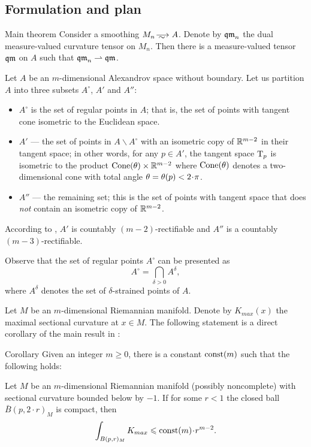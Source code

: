 \subsection{Formulation and plan}
  
\begin{thm}{Main theorem}\label{main}
Consider a smoothing $M_n\smooths{} A$.
Denote by $\operatorname{\mathfrak{qm}}_n$ the dual measure-valued curvature tensor on $M_n$.
Then there is a measure-valued tensor $\operatorname{\mathfrak{qm}}$ on $A$ such that $\operatorname{\mathfrak{qm}}_n\rightharpoonup \operatorname{\mathfrak{qm}}$.
\end{thm}

Let $A$ be an $m$-dimensional Alexandrov space without boundary. 
Let us partition $A$ into three subsets $A^\circ$, $A'$ and $A''$:
\begin{itemize}
\item $A^\circ$ is the set of regular points in $A$; that is, the set of points with tangent cone isometric to the Euclidean space.
\item $A'$ --- the set of points in $A\backslash A^\circ$ with an isometric copy of $\mathbb{R}^{m-2}$ in their tangent space;
in other words, for any $p\in A'$, the tangent space $\mathrm{T}_p$ is isometric to the product $\operatorname{Cone}(\theta)\times\mathbb{R}^{m-2}$ where $\operatorname{Cone}(\theta)$ denotes a two-dimensional cone with total angle $\theta\zz=\theta(p)<2\cdot \pi$.
\item $A''$ --- the remaining set; this is the set of points with tangent space that does \emph{not} contain an isometric copy of $\mathbb{R}^{m-2}$.
\end{itemize}
According to \cite{li-naber}, $A'$ is countably $(m-2)$-rectifiable and $A''$ is a countably $(m-3)$-rectifiable. 

Observe that the set of regular points $A^\circ$ can be presented as
$$A^{\circ}=\bigcap_{\delta>0} A^\delta,$$
where $A^\delta$ denotes the set of $\delta$-strained points of $A$.

Let $M$ be an $m$-dimensional Riemannian manifold.
Denote by $K_{max}(x)$ the maximal sectional curvature at $x\in M$.
The following statement is a direct corollary of the main result in \cite{petrunin-SC}:

\begin{thm}{Corollary}\label{cor:Kmax}
Given an integer $m\ge 0$, there is a constant $\mathrm{const}(m)$ such that the following holds:

Let $M$ be an $m$-dimensional Riemannian manifold 
(possibly noncomplete)
with sectional curvature bounded below by $-1$.
If for some $r<1$ the closed ball $\bar B(p,2\cdot r)_M$ is compact,
then 
$$\int_{B(p,r)_M} K_{max}\le \const(m)\cdot r^{m-2}.$$

\end{thm}

